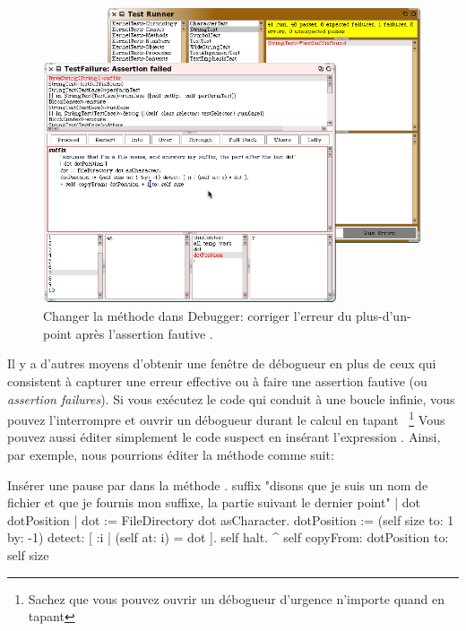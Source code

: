 \documentclass[a4paper,10pt,twoside]{book}
\begin{document}
\begin{figure}[btp]
	\begin{center}
		\includegraphics[width=\textwidth]{fixOffByOne}
	\end{center}
	\caption{Changer la m\'ethode  dans Debugger: corriger l'erreur du plus-d'un-point apr\`es l'assertion fautive \sunit.}
	\label{fig:fixOffByOne}
\end{figure}

Il y a d'autres moyens d'obtenir une fen\^etre de d\'ebogueur en plus de ceux
qui consistent \`a capturer une erreur effective ou \`a faire une assertion
fautive (ou \emph{assertion failures}).
Si vous ex\'ecutez le code qui conduit \`a une boucle infinie, vous pouvez
l'interrompre et ouvrir un d\'ebogueur durant le calcul en tapant %
~\footnote{Sachez que vous pouvez ouvrir un d\'ebogueur d'urgence n'importe quand en tapant
}
Vous pouvez aussi \'editer simplement le code suspect en ins\'erant l'expression .
Ainsi, par exemple, nous pourrions \'editer la m\'ethode  comme suit:

\needspace{11ex}
\begin{method}[suffix]{Ins\'erer une pause par  dans la m\'ethode .}
suffix
	"disons que je suis un nom de fichier et que je fournis mon suffixe, la partie suivant le dernier point"
	| dot dotPosition |
	dot := FileDirectory dot asCharacter.
	dotPosition := (self size to: 1 by: -1) detect: [ :i | (self at: i) = dot ].
	self halt.
	^ self copyFrom: dotPosition to: self size 
\end{method}
\end{document}
